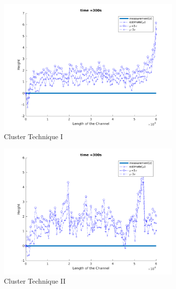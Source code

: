 \begin{figure}[H]
\centering
\begin{subfigure}[b]{0.3\textwidth}
\centering
\includegraphics[width=\textwidth]{figures_2/fig11}
\caption{Cluster Technique I}
\end{subfigure}
\begin{subfigure}[b]{0.3\textwidth}
\centering
\includegraphics[width=\textwidth]{figures_2/fig21}
\caption{Cluster Technique II}
\end{subfigure} 
\begin{subfigure}[b]{0.3\textwidth}
\centering

\end{subfigure}
\end{figure}
